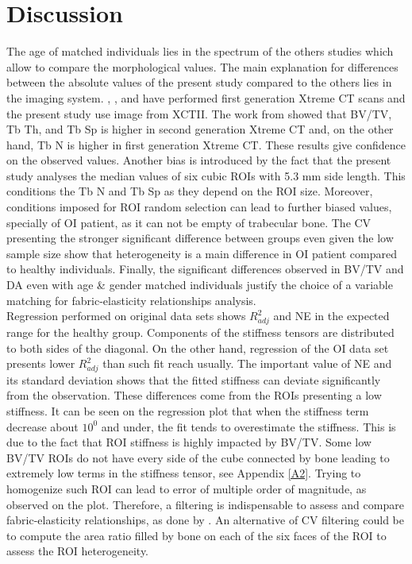 \documentclass[a4paper,fleqn]{DC_ArtStyle}
\begin{document}
\section{Discussion}
The age of matched individuals lies in the spectrum of the others studies which allow to compare the morphological values. The main explanation for differences between the absolute values of the present study compared to the others lies in the imaging system. \citeauthor{Folkestad2012}\cite{Folkestad2012}, \citeauthor{Kocijan2015}\cite{Kocijan2015}, and \citeauthor{Rolvien2018}\cite{Rolvien2018} have performed first generation Xtreme CT scans and the present study use image from XCTII. The work from \citeauthor{Agarwal2016}\cite{Agarwal2016} showed that BV/TV, Tb Th, and Tb Sp is higher in second generation Xtreme CT and, on the other hand, Tb N is higher in first generation Xtreme CT. These results give confidence on the observed values. Another bias is introduced by the fact that the present study analyses the median values of six cubic ROIs with 5.3 mm side length. This conditions the Tb N and Tb Sp as they depend on the ROI size. Moreover, conditions imposed for ROI random selection can lead to further biased values, specially of OI patient, as it can not be empty of trabecular bone. The CV presenting the stronger significant difference between groups even given the low sample size show that heterogeneity is a main difference in OI patient compared to healthy individuals. Finally, the significant differences observed in BV/TV and DA even with age \& gender matched individuals justify the choice of a variable matching for fabric-elasticity relationships analysis.\\

Regression performed on original data sets shows $R^2_{adj}$ and NE in the expected range for the healthy group. Components of the stiffness tensors are distributed to both sides of the diagonal. On the other hand, regression of the OI data set presents lower $R^2_{adj}$ than such fit reach usually. The important value of NE and its standard deviation shows that the fitted stiffness can deviate significantly from the observation. These differences come from the ROIs presenting a low stiffness. It can be seen on the regression plot that when the stiffness term decrease about $10^0$ and under, the fit tends to overestimate the stiffness. This is due to the fact that ROI stiffness is highly impacted by BV/TV. Some low BV/TV ROIs do not have every side of the cube connected by bone leading to extremely low terms in the stiffness tensor, see Appendix \ref{A2}. Trying to homogenize such ROI can lead to error of multiple order of magnitude, as observed on the plot. Therefore, a filtering is indispensable to assess and compare fabric-elasticity relationships, as done by \citeauthor{Panyasantisuk2015} \cite{Panyasantisuk2015}. An alternative of CV filtering could be to compute the area ratio filled by bone on each of the six faces of the ROI to assess the ROI heterogeneity.\\
\end{document}
